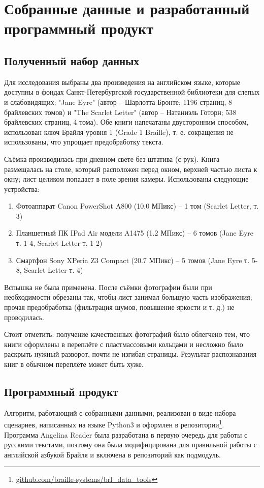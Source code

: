 \documentclass{main.tex}[subfiles]
\begin{document}
\newpage
\section{Собранные данные и разработанный программный продукт}
\subsection{Полученный набор данных}

Для исследования выбраны два произведения на английском языке, которые доступны в фондах Санкт-Петербургской государственной библиотеки для слепых и слабовидящих: "Jane Eyre"\hspace{0pt} (автор -- Шарлотта Бронте; 1196 страниц, 8 брайлевских томов) и "The Scarlet Letter"\hspace{0pt} (автор -- Натаниэль Готорн; 538 брайлевских страниц, 4 тома).
Обе книги напечатаны двусторонним способом, использован ключ Брайля уровня 1 (Grade 1 Braille), т. е. сокращения не использованы, что упрощает предобработку текста.

Съёмка производилась при дневном свете без штатива (с рук).
Книга размещалась на столе, который расположен перед окном, верхней частью листа к окну; лист целиком попадает в поле зрения камеры.
Использованы следующие устройства:

\begin{enumerate}[noitemsep]
    \item Фотоаппарат Canon PowerShot A800 (10.0 МПикс) -- 1 том (Scarlet Letter, т. 3)
    \item Планшетный ПК IPad Air модели A1475 (1.2 МПикс) -- 6 томов (Jane Eyre т. 1-4, Scarlet Letter т. 1-2)
    \item Смартфон Sony XPeria Z3 Compact (20.7 МПикс) -- 5 томов (Jane Eyre т. 5-8, Scarlet Letter т. 4)
\end{enumerate}
Вспышка не была применена.
После съёмки фотографии были при необходимости обрезаны так, чтобы лист занимал большую часть изображения; прочая предобработка (фильтрация шумов, повышение яркости и т. д.) не проводилась.

Стоит отметить: получение качественных фотографий было облегчено тем, что книги оформлены в переплёте с пластмассовыми кольцами и несложно было раскрыть нужный разворот, почти не изгибая страницы.
Результат распознавания книг в обычном переплёте может быть хуже.

\subsection{Программный продукт}

Алгоритм, работающий с собранными данными, реализован в виде набора сценариев, написанных на языке Python3 и оформлен в репозитории\footnote{\href{https://github.com/braille-systems/brl_data_tools}{github.com/braille-systems/brl\_data\_tools}}.
Программа Angelina Reader была разработана в первую очередь для работы с русскими текстами, поэтому она была модифицирована для правильной работы с английской азбукой Брайля и включена в репозиторий как подмодуль.
\end{document}
